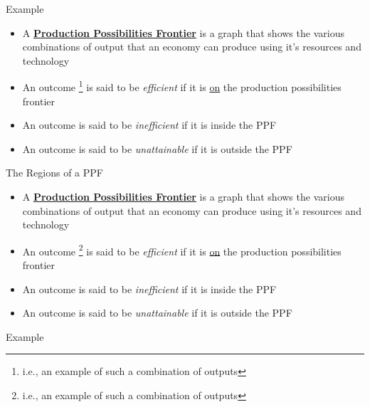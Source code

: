 \documentclass[10pt,xcolor={svgnames}]{beamer}
\begin{document}
\begin{frame}{Example}
\begin{itemize}[<+->]
    \item A \underline{\textbf{Production Possibilities Frontier}} is a graph that shows the various combinations of output that an economy can produce using it's resources and technology
    \item An outcome \footnote{i.e., an example of such a combination of outputs} is said to be \textit{efficient} if it is \underline{on} the production possibilities frontier
    \item An outcome is said to be \textit{inefficient} if it is inside the PPF
    \item An outcome is said to be \textit{unattainable} if it is outside the PPF
\end{itemize}
\end{frame}

\begin{frame}{The Regions of a PPF}
\begin{itemize}[<+->]
    \item A \underline{\textbf{Production Possibilities Frontier}} is a graph that shows the various combinations of output that an economy can produce using it's resources and technology
    \item An outcome \footnote{i.e., an example of such a combination of outputs} is said to be \textit{efficient} if it is \underline{on} the production possibilities frontier
    \item An outcome is said to be \textit{inefficient} if it is inside the PPF
    \item An outcome is said to be \textit{unattainable} if it is outside the PPF
\end{itemize}
\end{frame}


\begin{frame}{Example}

\end{frame}
\end{document}
